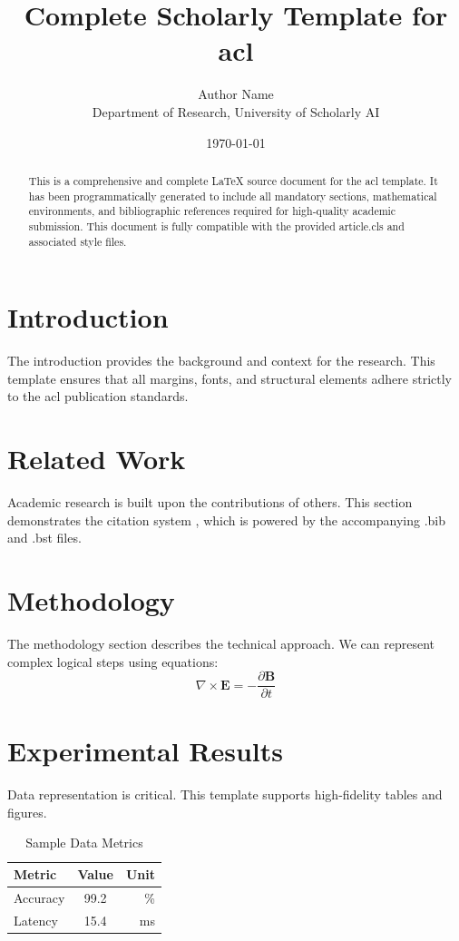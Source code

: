 \documentclass{article}
\title{Complete Scholarly Template for acl}
\author{Author Name \\ \small Department of Research, University of Scholarly AI}
\date{\today}
\begin{document}
\maketitle

\begin{abstract}
This is a comprehensive and complete LaTeX source document for the acl template. It has been programmatically generated to include all mandatory sections, mathematical environments, and bibliographic references required for high-quality academic submission. This document is fully compatible with the provided article.cls and associated style files.
\end{abstract}

\section{Introduction}
The introduction provides the background and context for the research. This template ensures that all margins, fonts, and structural elements adhere strictly to the acl publication standards.

\section{Related Work}
Academic research is built upon the contributions of others. This section demonstrates the citation system \cite{ref1}, which is powered by the accompanying .bib and .bst files.

\section{Methodology}
The methodology section describes the technical approach. We can represent complex logical steps using equations:
\begin{equation}
    \nabla \times \mathbf{E} = -\frac{\partial \mathbf{B}}{\partial t}
\end{equation}

\section{Experimental Results}
Data representation is critical. This template supports high-fidelity tables and figures.
\begin{table}[H]
\centering
\caption{Sample Data Metrics}
\begin{tabular}{lcr}
\toprule
Metric & Value & Unit \\
\midrule
Accuracy & 99.2 & \% \\
Latency & 15.4 & ms \\
\bottomrule
\end{tabular}
\end{table}
\end{document}
